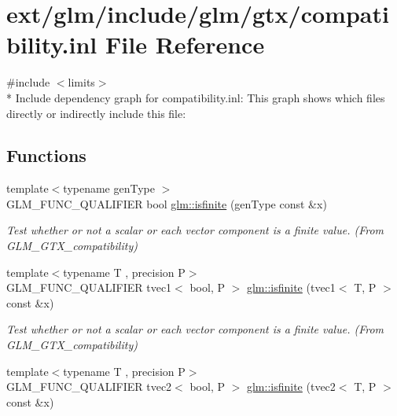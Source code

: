 \hypertarget{compatibility_8inl}{\section{ext/glm/include/glm/gtx/compatibility.inl File Reference}
\label{compatibility_8inl}
}
{\ttfamily \#include $<$limits$>$}\\*
Include dependency graph for compatibility.\-inl\-:
This graph shows which files directly or indirectly include this file\-:
\subsection*{Functions}
\begin{DoxyCompactItemize}
\item 
\hypertarget{group__gtx__compatibility_gaf4b04dcd3526996d68c1bfe17bfc8657}{{\footnotesize template$<$typename gen\-Type $>$ }\\G\-L\-M\-\_\-\-F\-U\-N\-C\-\_\-\-Q\-U\-A\-L\-I\-F\-I\-E\-R bool \hyperlink{group__gtx__compatibility_gaf4b04dcd3526996d68c1bfe17bfc8657}{glm\-::isfinite} (gen\-Type const \&x)}\label{group__gtx__compatibility_gaf4b04dcd3526996d68c1bfe17bfc8657}

\begin{DoxyCompactList}\small\item\em Test whether or not a scalar or each vector component is a finite value. (From G\-L\-M\-\_\-\-G\-T\-X\-\_\-compatibility) \end{DoxyCompactList}\item 
\hypertarget{group__gtx__compatibility_ga553e2e95b06a0f70c718605998889d3b}{{\footnotesize template$<$typename T , precision P$>$ }\\G\-L\-M\-\_\-\-F\-U\-N\-C\-\_\-\-Q\-U\-A\-L\-I\-F\-I\-E\-R tvec1$<$ bool, P $>$ \hyperlink{group__gtx__compatibility_ga553e2e95b06a0f70c718605998889d3b}{glm\-::isfinite} (tvec1$<$ T, P $>$ const \&x)}\label{group__gtx__compatibility_ga553e2e95b06a0f70c718605998889d3b}

\begin{DoxyCompactList}\small\item\em Test whether or not a scalar or each vector component is a finite value. (From G\-L\-M\-\_\-\-G\-T\-X\-\_\-compatibility) \end{DoxyCompactList}\item 
\hypertarget{group__gtx__compatibility_ga7dd492aa7d6ec21715f9a91b6e5e596a}{{\footnotesize template$<$typename T , precision P$>$ }\\G\-L\-M\-\_\-\-F\-U\-N\-C\-\_\-\-Q\-U\-A\-L\-I\-F\-I\-E\-R tvec2$<$ bool, P $>$ \hyperlink{group__gtx__compatibility_ga7dd492aa7d6ec21715f9a91b6e5e596a}{glm\-::isfinite} (tvec2$<$ T, P $>$ const \&x)}\label{group__gtx__compatibility_ga7dd492aa7d6ec21715f9a91b6e5e596a}


\end{DoxyCompactItemize}
